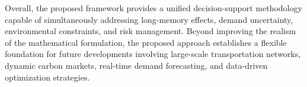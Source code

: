 Overall, the proposed framework provides a unified decision-support methodology capable of simultaneously addressing long-memory effects, demand uncertainty, environmental constraints, and risk management. Beyond improving the realism of the mathematical formulation, the proposed approach establishes a flexible foundation for future developments involving large-scale transportation networks, dynamic carbon markets, real-time demand forecasting, and data-driven optimization strategies.